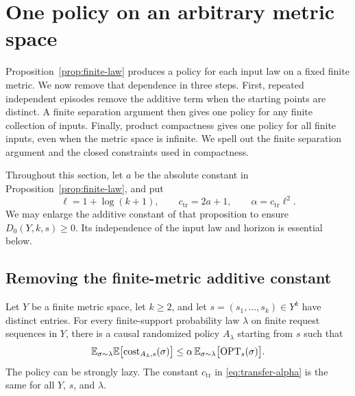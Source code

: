 \section{One policy on an arbitrary metric space}
\label{sec:transfer}

Proposition~\ref{prop:finite-law} produces a policy for each input law on
a fixed finite metric.  We now remove that dependence in three steps.
First, repeated independent episodes remove the additive term when the
starting points are distinct.  A finite separation argument then gives
one policy for any finite collection of inputs.  Finally, product compactness gives one policy for all finite inputs,
even when the metric space is infinite. We spell out the finite
separation argument and the closed constraints used in compactness.

Throughout this section, let $a$ be the absolute constant in
Proposition~\ref{prop:finite-law}, and put
\begin{equation}
 \ell=1+\log(k+1),\qquad c_{\mathrm{tr}}=2a+1,
 \qquad \alpha=c_{\mathrm{tr}}\ell^2.
 \label{eq:transfer-alpha}
\end{equation}
We may enlarge the additive constant of that proposition to ensure
$D_0(Y,k,s)\ge0$.  Its independence of the input law and horizon is
essential below.

\subsection{Removing the finite-metric additive constant}

\begin{lemma}
\label{lem:amplification}
Let $Y$ be a finite metric space, let $k\ge2$, and let
$s=(s_1,\ldots,s_k)\in Y^k$ have distinct entries.  For every
finite-support probability law $\lambda$ on finite request sequences in
$Y$, there is a causal randomized policy $A_\lambda$ starting from $s$
such that
\begin{equation}
 \mathbb E_{\sigma\sim\lambda}\mathbb E\bigl[\operatorname{cost}_{A_\lambda,s}(\sigma)\bigr]
 \le \alpha\,
      \mathbb E_{\sigma\sim\lambda}\bigl[\operatorname{OPT}_s(\sigma)\bigr].
 \label{eq:additive-free-law}
\end{equation}
The policy can be strongly lazy.  The constant $c_{\mathrm{tr}}$ in
\eqref{eq:transfer-alpha} is the same for all $Y$, $s$, and $\lambda$.
\end{lemma}

